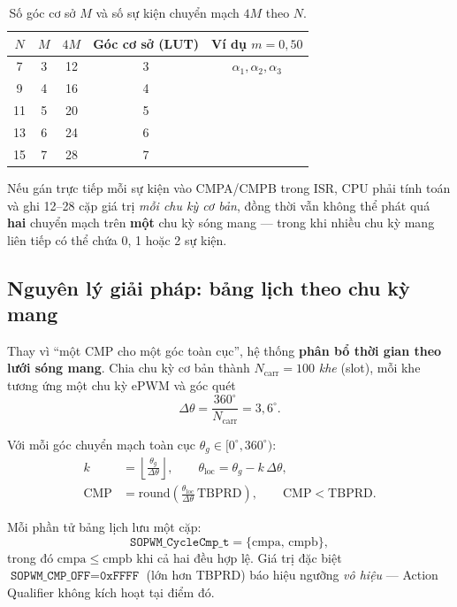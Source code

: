 \documentclass[12pt,a4paper]{article}
\begin{document}
\begin{table}[htbp]
  \centering
  \caption{Số góc cơ sở $M$ và số sự kiện chuyển mạch $4M$ theo $N$.}
  \label{tab:events}
  \begin{tabular}{@{}ccccc@{}}
    \toprule
    $N$ & $M$ & $4M$ & Góc cơ sở (LUT) & Ví dụ $m=0{,}50$ \\
    \midrule
    7  & 3 & 12 & 3 & $\alpha_1,\alpha_2,\alpha_3$ \\
    9  & 4 & 16 & 4 & \\
    11 & 5 & 20 & 5 & \\
    13 & 6 & 24 & 6 & \\
    15 & 7 & 28 & 7 & \\
    \bottomrule
  \end{tabular}
\end{table}

Nếu gán trực tiếp mỗi sự kiện vào CMPA/CMPB trong ISR, CPU phải tính toán và ghi 12--28 cặp giá trị \emph{mỗi chu kỳ cơ bản}, đồng thời vẫn không thể phát quá \textbf{hai} chuyển mạch trên \textbf{một} chu kỳ sóng mang --- trong khi nhiều chu kỳ mang liên tiếp có thể chứa 0, 1 hoặc 2 sự kiện.

\subsection{Nguyên lý giải pháp: bảng lịch theo chu kỳ mang}

Thay vì ``một CMP cho một góc toàn cục'', hệ thống \textbf{phân bổ thời gian theo lưới sóng mang}. Chia chu kỳ cơ bản thành $N_{\mathrm{carr}} = 100$ \emph{khe} (slot), mỗi khe tương ứng một chu kỳ ePWM và góc quét
\begin{equation}
  \Delta\theta = \frac{360^\circ}{N_{\mathrm{carr}}} = 3{,}6^\circ.
\end{equation}

Với mỗi góc chuyển mạch toàn cục $\theta_g \in [0^\circ, 360^\circ)$:
\begin{align}
  k &= \left\lfloor \frac{\theta_g}{\Delta\theta} \right\rfloor, \qquad
  \theta_{\mathrm{loc}} = \theta_g - k\,\Delta\theta, \label{eq:slot}\\
  \mathrm{CMP} &= \mathrm{round}\!\left(
    \frac{\theta_{\mathrm{loc}}}{\Delta\theta}\,\mathrm{TBPRD}
  \right), \qquad \mathrm{CMP} < \mathrm{TBPRD}.
  \label{eq:cmp_counts}
\end{align}

Mỗi phần tử bảng lịch lưu một cặp:
\begin{equation}
  \texttt{SOPWM\_CycleCmp\_t} = \{\mathrm{cmpa},\, \mathrm{cmpb}\},
\end{equation}
trong đó $\mathrm{cmpa} \le \mathrm{cmpb}$ khi cả hai đều hợp lệ. Giá trị đặc biệt $\texttt{SOPWM\_CMP\_OFF} = \texttt{0xFFFF}$ (lớn hơn TBPRD) báo hiệu ngưỡng \emph{vô hiệu} --- Action Qualifier không kích hoạt tại điểm đó.
\end{document}
